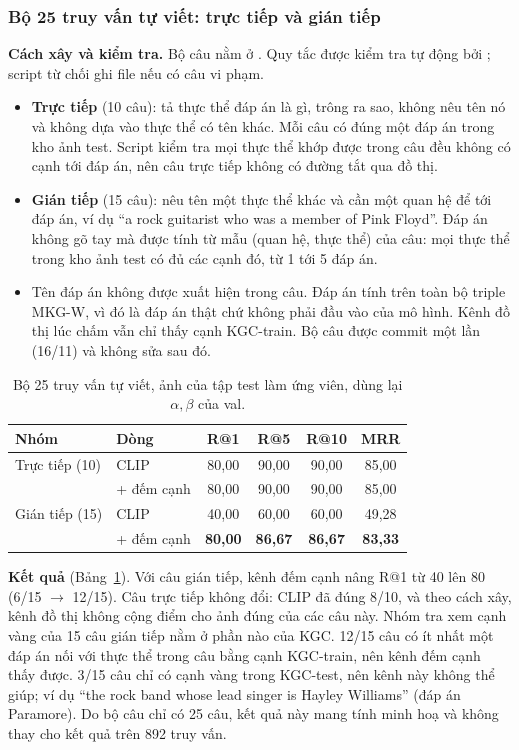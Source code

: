 \subsubsection{Bộ 25 truy vấn tự viết: trực tiếp và gián tiếp}\label{sec:l2-hand}
\textbf{Cách xây và kiểm tra.} Bộ câu nằm ở . Quy tắc được kiểm tra tự động bởi
; script từ chối ghi file nếu có câu vi phạm.
\begin{itemize}
\item \textbf{Trực tiếp} (10 câu): tả thực thể đáp án là gì, trông ra sao, không nêu tên nó và không dựa vào thực thể có tên
khác. Mỗi câu có đúng một đáp án trong kho ảnh test. Script kiểm tra mọi thực thể khớp được trong câu đều không có cạnh tới
đáp án, nên câu trực tiếp không có đường tắt qua đồ thị.
\item \textbf{Gián tiếp} (15 câu): nêu tên một thực thể khác và cần một quan hệ để tới đáp án, ví dụ ``a rock guitarist who
was a member of Pink Floyd''. Đáp án không gõ tay mà được tính từ mẫu (quan hệ, thực thể) của câu: mọi thực thể trong kho
ảnh test có đủ các cạnh đó, từ 1 tới 5 đáp án.
\item Tên đáp án không được xuất hiện trong câu. Đáp án tính trên toàn bộ triple MKG-W, vì đó là đáp án thật chứ không phải
đầu vào của mô hình. Kênh đồ thị lúc chấm vẫn chỉ thấy cạnh KGC-train. Bộ câu được commit một lần (16/11) và không sửa sau đó.
\end{itemize}

\begin{table}[t]
\centering
\caption{Bộ 25 truy vấn tự viết, ảnh của tập test làm ứng viên, dùng lại $\alpha,\beta$ của val.}
\label{tab:l2-hand}
\footnotesize
\setlength{\tabcolsep}{3pt}
\begin{tabular}{llcccc}
\toprule
Nhóm & Dòng & R@1 & R@5 & R@10 & MRR \\
\midrule
Trực tiếp (10) & CLIP & 80,00 & 90,00 & 90,00 & 85,00 \\
 & + đếm cạnh & 80,00 & 90,00 & 90,00 & 85,00 \\
Gián tiếp (15) & CLIP & 40,00 & 60,00 & 60,00 & 49,28 \\
 & + đếm cạnh & \textbf{80,00} & \textbf{86,67} & \textbf{86,67} & \textbf{83,33} \\
\bottomrule
\end{tabular}
\end{table}

\textbf{Kết quả} (Bảng~\ref{tab:l2-hand}). Với câu gián tiếp, kênh đếm cạnh nâng R@1 từ 40 lên 80 (6/15 $\to$ 12/15). Câu
trực tiếp không đổi: CLIP đã đúng 8/10, và theo cách xây, kênh đồ thị không cộng điểm cho ảnh đúng của các câu này. Nhóm tra
xem cạnh vàng của 15 câu gián tiếp nằm ở phần nào của KGC. 12/15 câu có ít nhất một đáp án nối với thực thể trong câu bằng
cạnh KGC-train, nên kênh đếm cạnh thấy được. 3/15 câu chỉ có cạnh vàng trong KGC-test, nên kênh này không thể giúp; ví dụ
``the rock band whose lead singer is Hayley Williams'' (đáp án Paramore). Do bộ câu chỉ có 25 câu, kết quả này mang tính
minh hoạ và không thay cho kết quả trên 892 truy vấn.

